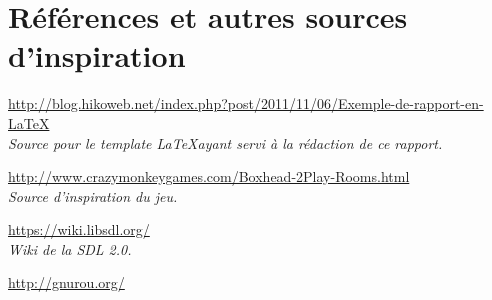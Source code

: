 \section*{Références et autres sources d'inspiration}
	
\url{http://blog.hikoweb.net/index.php?post/2011/11/06/Exemple-de-rapport-en-LaTeX} \\
\emph{Source pour le template \LaTeX ayant servi à la rédaction de ce rapport.}

\url{http://www.crazymonkeygames.com/Boxhead-2Play-Rooms.html} \\
\emph{Source d'inspiration du jeu.}

\url{https://wiki.libsdl.org/} \\
\emph{Wiki de la SDL 2.0.}

\url{http://gnurou.org/} \\
